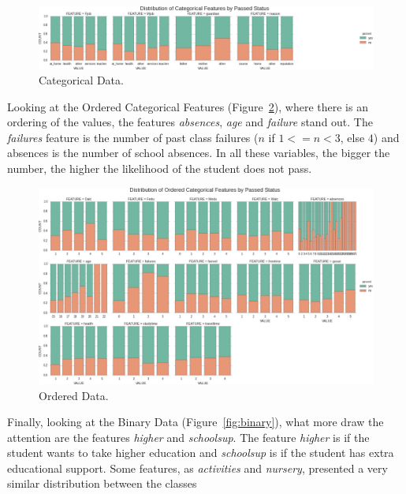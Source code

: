 \documentclass[a4paper]{article}
\begin{document}
\begin{figure}[ht]
\centering
\includegraphics[width=1\textwidth]{figures/categorical.png}
\caption{\label{fig:categorical}Categorical Data.}
\end{figure}

Looking at the Ordered Categorical Features (Figure~\ref{fig:ordCategorical}), where there is an ordering of the values, the features \textit{absences}, \textit{age} and \textit{failure} stand out. The \textit{failures} feature is the number of past class failures ($n$ if $1<=n<3$, else $4$) and absences is the number of school absences. In all these variables, the bigger the number, the higher the likelihood of the student does not pass.

\begin{figure}[ht]
\centering
\includegraphics[width=1\textwidth]{figures/ordCategorical.png}
\caption{\label{fig:ordCategorical}Ordered Data.}
\end{figure}

Finally, looking at the Binary Data (Figure~\ref{fig:binary}), what more draw the attention are the features \textit{higher} and \textit{schoolsup}. The feature \textit{higher} is if the student wants to take higher education and \textit{schoolsup} is if the student has extra educational support. Some features, as \textit{activities} and \textit{nursery}, presented a very similar distribution between the classes
\end{document}
